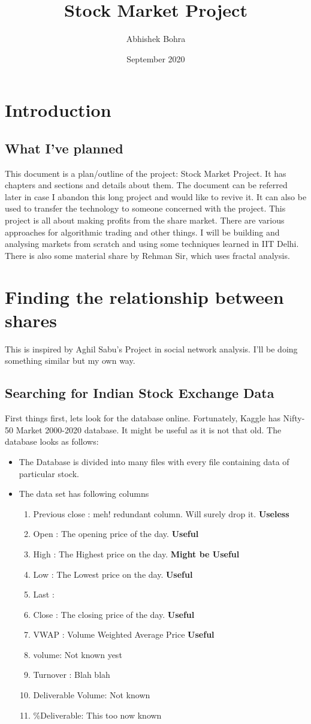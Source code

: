 \documentclass[12pt]{Book}
\title{Stock Market Project}
\author{Abhishek Bohra}
\date{September 2020}
\begin{document}
\nocite{*}
    \maketitle
\chapter{Introduction}
	\section{What I've planned}
	This document is a plan/outline of the project: Stock Market Project. It has chapters and sections and details about them. The document can be referred later in case I abandon this long project and would like to revive it. It can also be used to transfer the technology to someone concerned with the project.
		This project is all about making profits from the share market. There are various approaches for algorithmic trading and other things. I will be building and analysing markets from scratch and using some techniques learned in IIT Delhi.
		There is also some material share by Rehman Sir, which uses fractal analysis.
\chapter{Finding the relationship between shares}
	This is inspired by Aghil Sabu's Project in social network analysis. I'll be doing something similar but my own way.
	\section{Searching for Indian Stock Exchange Data}
		First things first, lets look for the database online. Fortunately, Kaggle has Nifty-50 Market 2000-2020 database. It might be useful as it is not that old. The database looks as follows:
		\begin{itemize}
		\item The Database is divided into many files with every file containing data of particular stock.
		\item The data set has following columns
			\begin{enumerate}
			\item Previous close : meh! redundant column. Will surely drop it. \textbf{Useless}
			\item Open : The opening price of the day. \textbf{Useful}
			\item High : The Highest price on the day. \textbf{Might be Useful}
			\item Low : The Lowest price on the day.	\textbf{Useful}
			\item Last : 
			\item Close : The closing price of the day.	\textbf{Useful}
			\item VWAP : Volume Weighted Average Price \textbf{Useful}
			\item volume: Not known yest
			\item Turnover : Blah blah
			\item Deliverable Volume: Not known 
			\item \%Deliverable: This too now known
			\end{enumerate}
		\end{itemize}
\end{document}
